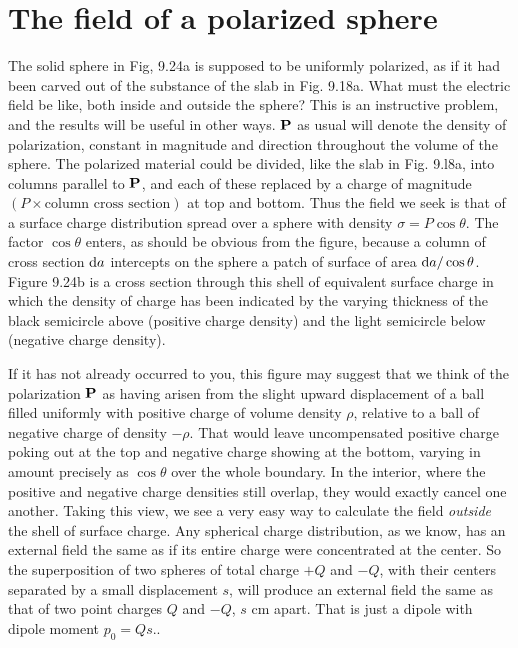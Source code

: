 \section{The field of a polarized sphere}

The solid sphere in Fig, 9.24a is supposed to be uniformly 
polarized, as if it had been carved out of the substance of the slab in
Fig. 9.18a. What must the electric field be like, both inside and outside
the sphere? This is an instructive problem, and the results will
be useful in other ways. $\mathbf{P}$ as usual will denote the density of
polarization, constant in magnitude and direction throughout the volume
of the sphere. The polarized material could be divided, like the slab
in Fig. 9.l8a, into columns parallel to $\mathbf{P}$, and each of these replaced
by a charge of magnitude $(P \times \text{column cross section})$ at top and
bottom. Thus the field we seek is that of a surface charge distribution
spread over a sphere with density $\sigma = P \cos \theta$. The factor $\cos\theta$
enters, as should be obvious from the figure, because a column of
cross section $\textup{d} a$ intercepts on the sphere a patch of surface of area
$\textup{d} a/\cos \theta$. Figure 9.24b is a cross section through this shell of equivalent
surface charge in which the density of charge has been indicated
by the varying thickness of the black semicircle above (positive
charge density) and the light semicircle below (negative charge
density).

If it has not already occurred to you, this figure may suggest that
we think of the polarization $\mathbf{P}$ as having arisen from the slight upward
displacement of a ball filled uniformly with positive charge of
volume density $\rho$, relative to a ball of negative charge of density  $-\rho$.
That would leave uncompensated positive charge poking out at the
top and negative charge showing at the bottom, varying in amount
precisely as $\cos\theta$ over the whole boundary. In the interior, where
the positive and negative charge densities still overlap, they would
exactly cancel one another. Taking this view, we see a very easy way
to calculate the field \emph{outside} the shell of surface charge. Any
spherical charge distribution, as we know, has an external field the
same as if its entire charge were concentrated at the center. So the
superposition of two spheres of total charge $+Q$ and  $-Q$,
 with their centers separated by a small displacement $s$, will
produce an external field the same as that of two point charges $Q$ and
$-Q$, $s$ cm apart. That is just a dipole with dipole moment $p_0=Qs$..

